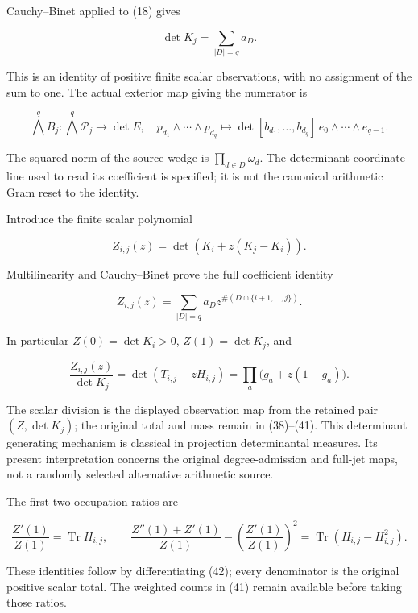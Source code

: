 Cauchy--Binet applied to (18) gives

\[
 \boxed{\det K_j=\sum_{|D|=q}a_D.}                              \tag{38}
\]

This is an identity of positive finite scalar observations, with no assignment of the sum to one. The actual exterior map giving the numerator is

\[
 \bigwedge^q B_j:\bigwedge^q\mathcal P_j\to\det E,
 \quad p_{d_1}\wedge\cdots\wedge p_{d_q}
       \mapsto\det[b_{d_1},\ldots,b_{d_q}]\,e_0\wedge\cdots\wedge e_{q-1}.
                                                                    \tag{39}
\]

The squared norm of the source wedge is \(\prod_{d\in D}\omega_d\). The determinant-coordinate line used to read its coefficient is specified; it is not the canonical arithmetic Gram reset to the identity.

Introduce the finite scalar polynomial

\[
 Z_{i,j}(z)=\det(K_i+z(K_j-K_i)).                                 \tag{40}
\]

Multilinearity and Cauchy--Binet prove the full coefficient identity

\[
 \boxed{Z_{i,j}(z)=
 \sum_{|D|=q}a_Dz^{\#(D\cap\{i+1,\ldots,j\})}.}                \tag{41}
\]

In particular \(Z(0)=\det K_i>0\), \(Z(1)=\det K_j\), and

\[
 \boxed{\frac{Z_{i,j}(z)}{\det K_j}
 =\det(T_{i,j}+zH_{i,j})
 =\prod_a\bigl(g_a+z(1-g_a)\bigr).}                              \tag{42}
\]

The scalar division is the displayed observation map from the retained pair \((Z,\det K_j)\); the original total and mass remain in (38)--(41). This determinant generating mechanism is classical in projection determinantal measures. Its present interpretation concerns the original degree-admission and full-jet maps, not a randomly selected alternative arithmetic source.

The first two occupation ratios are

\[
 \frac{Z'(1)}{Z(1)}=\operatorname{Tr}H_{i,j},\qquad
 \frac{Z''(1)+Z'(1)}{Z(1)}
 -\left(\frac{Z'(1)}{Z(1)}\right)^2
 =\operatorname{Tr}(H_{i,j}-H_{i,j}^2).                           \tag{43}
\]

These identities follow by differentiating (42); every denominator is the original positive scalar total. The weighted counts in (41) remain available before taking those ratios.

